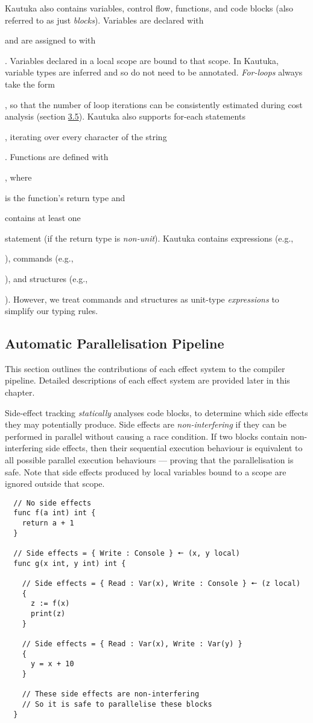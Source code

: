 Kautuka also contains variables, control flow, functions, and code blocks (also referred to as just \textit{blocks}). Variables are declared with  and are assigned to with . Variables declared in a local scope are bound to that scope. In Kautuka, variable types are inferred and so do not need to be annotated. \textit{For-loops} always take the form , so that the number of loop iterations can be consistently estimated during cost analysis (section \hyperref[sec:3.5]{3.5}). Kautuka also supports for-each statements , iterating over every character of the string . Functions are defined with , where  is the function's return type and  contains at least one  statement (if the return type is \textit{non-unit}). Kautuka contains expressions (e.g., ), commands (e.g., ), and structures (e.g., ). However, we treat commands and structures as unit-type \textit{expressions} to simplify our typing rules.

\subsection{Automatic Parallelisation Pipeline}

\label{sec:2.1.3}

This section outlines the contributions of each effect system to the compiler pipeline. Detailed descriptions of each effect system are provided later in this chapter.

Side-effect tracking \textit{statically} analyses code blocks, to determine which side effects they may potentially produce. Side effects are \textit{non-interfering} if they can be performed in parallel without causing a race condition. If two blocks contain non-interfering side effects, then their sequential execution behaviour is equivalent to all possible parallel execution behaviours --- proving that the parallelisation is safe. Note that side effects produced by local variables bound to a scope are ignored outside that scope.

\newpage

\begin{verbatim}
  // No side effects 
  func f(a int) int { 
    return a + 1
  }

  // Side effects = { Write : Console } 🠔 (x, y local)
  func g(x int, y int) int { 

    // Side effects = { Read : Var(x), Write : Console } 🠔 (z local)
    {
      z := f(x)
      print(z)
    } 

    // Side effects = { Read : Var(x), Write : Var(y) }
    {
      y = x + 10
    }

    // These side effects are non-interfering 
    // So it is safe to parallelise these blocks 
  }
\end{verbatim}

